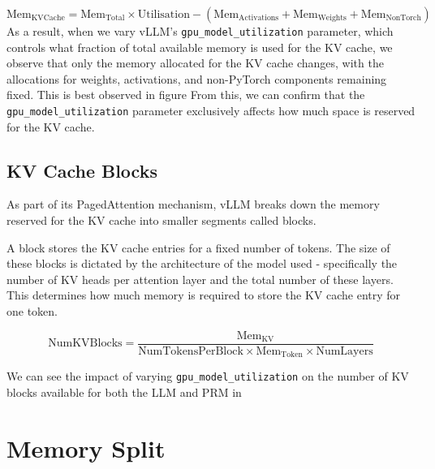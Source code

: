 \documentclass[11pt,twoside]{report}
\begin{document}
\begin{equation*}
  \text{Mem}_{\text{KVCache}} = \text{Mem}_{\text{Total}} \times \text{Utilisation} - (\text{Mem}_{\text{Activations}} + \text{Mem}_{\text{Weights}} + \text{Mem}_{\text{NonTorch}})
\end{equation*}
As a result, when we vary vLLM’s \texttt{gpu\_model\_utilization} parameter, which controls what fraction of total available memory is used for the KV cache, we observe that only the memory allocated for the KV cache changes, with the allocations for weights, activations, and non-PyTorch components remaining fixed.
This is best observed in figure %
From this, we can confirm that the \texttt{gpu\_model\_utilization} parameter exclusively affects how much space is reserved for the KV cache. %


\subsection{KV Cache Blocks}
As part of its PagedAttention mechanism, vLLM breaks down the memory reserved for the KV cache into smaller segments called blocks.

A block stores the KV cache entries for a fixed number of tokens.
The size of these blocks is dictated by the architecture of the model used - specifically the number of KV heads per attention layer and the total number of these layers.
This determines how much memory is required to store the KV cache entry for one token.

\begin{equation*}
  \text{NumKVBlocks} = \frac{\text{Mem}_{\text{KV}}}{\text{NumTokensPerBlock} \times \text{Mem}_{\text{Token}} \times \text{NumLayers}}
\end{equation*}

We can see the impact of varying \texttt{gpu\_model\_utilization} on the number of KV blocks available for both the LLM and PRM in %

\section{Memory Split}

\end{document}
